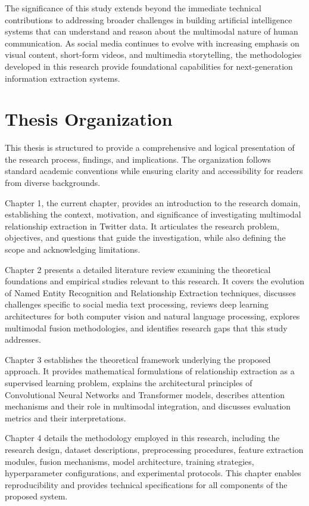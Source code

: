 \documentclass[12pt,a4paper]{report}
\begin{document}
The significance of this study extends beyond the immediate technical contributions to addressing broader challenges in building artificial intelligence systems that can understand and reason about the multimodal nature of human communication. As social media continues to evolve with increasing emphasis on visual content, short-form videos, and multimedia storytelling, the methodologies developed in this research provide foundational capabilities for next-generation information extraction systems.

\section{Thesis Organization}

This thesis is structured to provide a comprehensive and logical presentation of the research process, findings, and implications. The organization follows standard academic conventions while ensuring clarity and accessibility for readers from diverse backgrounds.

Chapter 1, the current chapter, provides an introduction to the research domain, establishing the context, motivation, and significance of investigating multimodal relationship extraction in Twitter data. It articulates the research problem, objectives, and questions that guide the investigation, while also defining the scope and acknowledging limitations.

Chapter 2 presents a detailed literature review examining the theoretical foundations and empirical studies relevant to this research. It covers the evolution of Named Entity Recognition and Relationship Extraction techniques, discusses challenges specific to social media text processing, reviews deep learning architectures for both computer vision and natural language processing, explores multimodal fusion methodologies, and identifies research gaps that this study addresses.

Chapter 3 establishes the theoretical framework underlying the proposed approach. It provides mathematical formulations of relationship extraction as a supervised learning problem, explains the architectural principles of Convolutional Neural Networks and Transformer models, describes attention mechanisms and their role in multimodal integration, and discusses evaluation metrics and their interpretations.

Chapter 4 details the methodology employed in this research, including the research design, dataset descriptions, preprocessing procedures, feature extraction modules, fusion mechanisms, model architecture, training strategies, hyperparameter configurations, and experimental protocols. This chapter enables reproducibility and provides technical specifications for all components of the proposed system.
\end{document}
